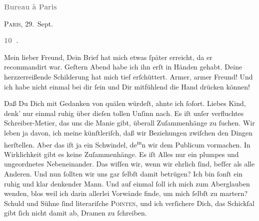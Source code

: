 \pstart
           \begin{otherlanguage}{french}\textcolor{gray}{\textbf{\textbf{Bureau à Paris}}}\end{otherlanguage}\hfill \textsc{Paris}, 29. Sept.\pend
           
\pstart
           \begin{otherlanguage}{french}\textcolor{gray}{\textbf{\textbf{10 .}}}\end{otherlanguage}\pend
           
\pstart\center{}Mein lieber Freund,\pend\vspace{0.5em}
\pstart
           Dein Brief hat mich etwas ſpäter erreicht, da er recommandirt war. Geſtern{ }Abend habe ich ihn erſt in Händen gehabt. Deine herzzerreißende
               Schilderung hat mich tief erſchüttert. Armer, armer Freund! Und ich habe nicht einmal
               bei dir ſein und Dir mitfühlend die Hand drücken können!\pend
           
\pstart
           Daß Du Dich mit Gedanken von \label{K_L02827-1v}\label{K_L02827-1} quälen würdeſt, ahnte ich ſofort. Liebes Kind, denk’ nur einmal ruhig über
               dieſen tollen Unſinn nach. Es iſt unſer \strikeout{\textcolor{gray}{×}\-\textcolor{gray}{×}\-\textcolor{gray}{×}\-\textcolor{gray}{×}{ }\textcolor{gray}{×}\-\textcolor{gray}{×}\-\textcolor{gray}{×}\-\textcolor{gray}{×}\-\textcolor{gray}{×}\-\textcolor{gray}{×}{ }\textcolor{gray}{×}\-\textcolor{gray}{×}\-\textcolor{gray}{×}\-\textcolor{gray}{×}} verfluchtes Schreiber-{\pb}Metier, das uns die
               Manie gibt, überall Zuſammenhänge zu ſuchen. Wir leben ja davon, ich meine
               künſtleriſch, daß wir Beziehungen zwiſchen den Dingen herſtellen. Aber das iſt ja ein
               Schwindel, de\substVorne{}\textsuperscript{m}\substDazwischen{}n\substHinten{} wir dem Publicum vormachen. In Wirklichkeit gibt es keine Zuſammenhänge. Es
               iſt Alles nur ein plumpes und ungeordnetes Nebeneinander. Das wiſſen wir, wenn wir
               ehrlich ſind, beſſer als alle Anderen. Und nun ſollten wir uns gar ſelbſt damit
               betrügen? Ich bin ſonſt ein ruhig und klar denkender Mann. Und auf einmal ſoll ich
               mich zum Aber{\pb}glauben wenden, blos weil ich darin
               allerlei Vorwände finde\strikeout{\textcolor{gray}{n}}, um mich ſelbſt zu martern? Schuld und Sühne ſind literariſche \textsc{Pointen}, und
               ich verſichere Dich, das Schickſal gibt ſich nicht damit ab, Dramen zu ſchreiben.\pend
           
